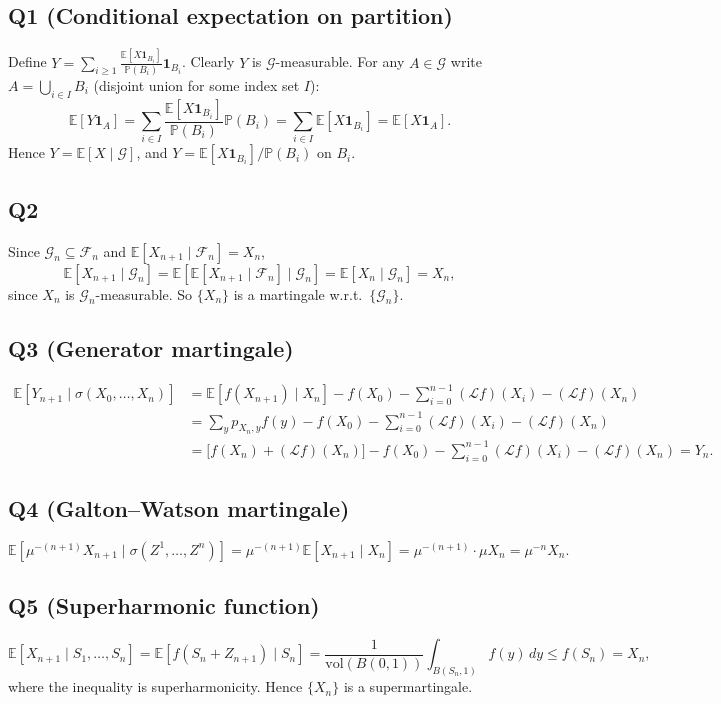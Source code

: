 \documentclass[11pt]{article}
\newcommand{\PP}{\mathbb{P}}
\newcommand{\EE}{\mathbb{E}}
\newcommand{\1}{\mathbf{1}}
\begin{document}
\subsection*{Q1 (Conditional expectation on partition)}
Define $Y=\sum_{i\ge1}\frac{\EE[X\1_{B_i}]}{\PP(B_i)}\1_{B_i}$.  Clearly $Y$ is $\mathcal G$-measurable.  For any $A\in\mathcal G$ write $A=\bigcup_{i\in I}B_i$ (disjoint union for some index set $I$):
\[
\EE[Y\1_A]=\sum_{i\in I}\frac{\EE[X\1_{B_i}]}{\PP(B_i)}\PP(B_i)=\sum_{i\in I}\EE[X\1_{B_i}]=\EE[X\1_A].
\]
Hence $Y=\EE[X\mid\mathcal G]$, and $Y=\EE[X\1_{B_i}]/\PP(B_i)$ on $B_i$.

\subsection*{Q2}
Since $\mathcal G_n\subseteq\mathcal F_n$ and $\EE[X_{n+1}\mid\mathcal F_n]=X_n$,
\[
\EE[X_{n+1}\mid\mathcal G_n]=\EE[\EE[X_{n+1}\mid\mathcal F_n]\mid\mathcal G_n]=\EE[X_n\mid\mathcal G_n]=X_n,
\]
since $X_n$ is $\mathcal G_n$-measurable.  So $\{X_n\}$ is a martingale w.r.t.\ $\{\mathcal G_n\}$.

\subsection*{Q3 (Generator martingale)}
\begin{align*}
\EE[Y_{n+1}\mid\sigma(X_0,\ldots,X_n)]
&=\EE[f(X_{n+1})\mid X_n]-f(X_0)-\sum_{i=0}^{n-1}(\mathcal Lf)(X_i)-(\mathcal Lf)(X_n)\\
&=\sum_y p_{X_n,y}f(y)-f(X_0)-\sum_{i=0}^{n-1}(\mathcal Lf)(X_i)-(\mathcal Lf)(X_n)\\
&=\bigl[f(X_n)+(\mathcal Lf)(X_n)\bigr]-f(X_0)-\sum_{i=0}^{n-1}(\mathcal Lf)(X_i)-(\mathcal Lf)(X_n)=Y_n.
\end{align*}

\subsection*{Q4 (Galton--Watson martingale)}
\[
\EE\!\left[\mu^{-(n+1)}X_{n+1}\mid\sigma(Z^1,\ldots,Z^n)\right]
=\mu^{-(n+1)}\EE[X_{n+1}\mid X_n]
=\mu^{-(n+1)}\cdot\mu X_n=\mu^{-n}X_n.
\]

\subsection*{Q5 (Superharmonic function)}
\[
\EE[X_{n+1}\mid S_1,\ldots,S_n]
=\EE[f(S_n+Z_{n+1})\mid S_n]
=\frac{1}{\mathrm{vol}(B(0,1))}\int_{B(S_n,1)}f(y)\,dy\le f(S_n)=X_n,
\]
where the inequality is superharmonicity.  Hence $\{X_n\}$ is a supermartingale.
\end{document}
